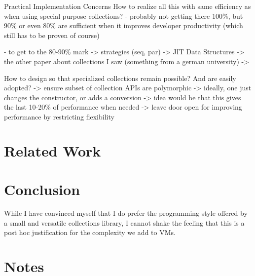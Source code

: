 \documentclass[sigconf, 10pt, review]{acmart}
\begin{document}
Practical Implementation Concerns
 How to realize all this with same efficiency as when using special purpose
 collections?
 - probably not getting there 100\%, but 90\% or even 80\% are sufficient
   when it improves developer productivity (which still has to be proven of course)
  
 - to get to the 80-90\% mark
  -> strategies (seq, par)
  -> JIT Data Structures
     -> the other paper about collections I saw (something from a german university)
  ->

How to design so that specialized collections remain possible?
And are easily adopted?
 -> ensure subset of collection APIs are polymorphic
   -> ideally, one just changes the constructor, or adds a conversion
   -> idea would be that this gives the last 10-20\% of performance when needed
   -> leave door open for improving performance by restricting flexibility






\section{Related Work}

\section{Conclusion}



While I have convinced myself
that I do prefer the programming style offered
by a small and versatile collections library,
I cannot shake the feeling
that this is a post hoc justification
for the complexity we add to VMs.

\section{Notes}
\end{document}
